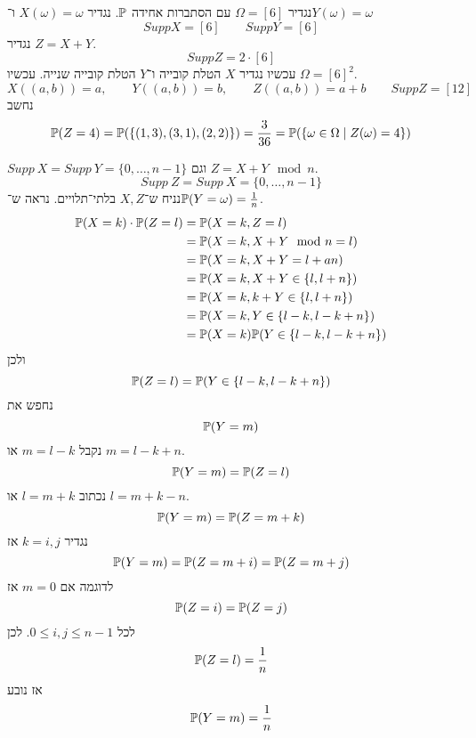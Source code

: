 

\usepackage{ifthen}



נגדיר $\Omega = [6]$ עם הסתברות אחידה $\mathbb{P}$.
נגדיר $X(\omega) = \omega$ ו־$Y(\omega) = \omega$
\[
	Supp X = [6]
	\qquad
	Supp Y = [6]
\]
נגדיר $Z = X + Y$.
\[
	Supp Z = 2 \cdot [6]
\]
עכשיו נגדיר $X$ הטלת קובייה ו־$Y$ הטלת קובייה שנייה. עכשיו $\Omega = {[6]}^2$.
\[
	X((a, b)) = a,
	\qquad
	Y((a, b)) = b,
	\qquad
	Z((a, b)) = a + b
	\qquad
	Supp Z = [12]
\]
נחשב
\[
	\mathbb{P}(Z = 4) = \mathbb{P}(\{(1, 3), (3, 1), (2, 2)\}) = \frac{3}{36}
	= \mathbb{P}(\{\omega \in \Omega \mid Z(\omega) = 4\})
\]

$Supp\ X = Supp\ Y = \{0, \dots, n - 1\}$ וגם $Z = X + Y \mod n$.
\[
	Supp\ Z = Supp\ X = \{0, \dots, n - 1\}
\]
נניח ש־$X, Z$ בלתי־תלויים. נראה ש־$\mathbb{P}(Y = \omega) = \frac{1}{n}$.
\begin{align*}
	\mathbb{P}(X = k) \cdot \mathbb{P}(Z = l)
	& = \mathbb{P}(X = k, Z = l) \\
	& = \mathbb{P}(X = k, X + Y \mod n = l) \\
	& = \mathbb{P}(X = k, X + Y = l + a n) \\
	& = \mathbb{P}(X = k, X + Y \in \{l, l + n\}) \\
	& = \mathbb{P}(X = k, k + Y \in \{l, l + n\}) \\
	& = \mathbb{P}(X = k, Y \in \{l - k, l - k + n\}) \\
	& = \mathbb{P}(X = k) \mathbb{P}(Y \in \{l - k, l - k + n\}) \\
\end{align*}
ולכן
\[
	\mathbb{P}(Z = l) = \mathbb{P}(Y \in \{l - k, l - k + n\})
\]
נחפש את
\[
	\mathbb{P}(Y = m)
\]
נקבל $m = l - k$ או $m = l - k + n$.
\[
	\mathbb{P}(Y = m) = \mathbb{P}(Z = l)
\]
נכתוב $l = m + k$ או $l = m + k - n$.
\[
	\mathbb{P}(Y = m) = \mathbb{P}(Z = m + k)
\]
נגדיר $k = i, j$
אז
\[
	\mathbb{P}(Y = m) = \mathbb{P}(Z = m + i) = \mathbb{P}(Z = m + j)
\]
לדוגמה אם $m = 0$ אז
\[
	\mathbb{P}(Z = i) = \mathbb{P}(Z = j)
\]
לכל $0 \le i, j \le n - 1$.
לכן
\[
	\mathbb{P}(Z = l) = \frac{1}{n}
\]
אז נובע
\[
	\mathbb{P}(Y = m) = \frac{1}{n}
\]


